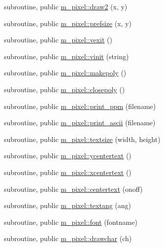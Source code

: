 \begin{DoxyCompactItemize}
\item 
subroutine, public \mbox{\hyperlink{namespacem__pixel_a12012e819bb14b27d2b49732aa2e4e55}{m\+\_\+pixel\+::draw2}} (x, y)
\item 
subroutine, public \mbox{\hyperlink{namespacem__pixel_acc868686f05b7e0b3cd33bf9d1c6bb98}{m\+\_\+pixel\+::prefsize}} (x, y)
\item 
subroutine, public \mbox{\hyperlink{namespacem__pixel_a19ad6b65752322b0029a62cc0ebec3e8}{m\+\_\+pixel\+::vexit}} ()
\item 
subroutine, public \mbox{\hyperlink{namespacem__pixel_ac03ca8f23fdadb60599b6ea4dc87a6d9}{m\+\_\+pixel\+::vinit}} (string)
\item 
subroutine, public \mbox{\hyperlink{namespacem__pixel_ab7128437f95b40004bf73fc6e3f597f8}{m\+\_\+pixel\+::makepoly}} ()
\item 
subroutine, public \mbox{\hyperlink{namespacem__pixel_ab3dc83b63d2ab1bf3f63932abca4245d}{m\+\_\+pixel\+::closepoly}} ()
\item 
subroutine, public \mbox{\hyperlink{namespacem__pixel_a01797b04ce7c693c3fd6a841e8d1de48}{m\+\_\+pixel\+::print\+\_\+ppm}} (filename)
\item 
subroutine, public \mbox{\hyperlink{namespacem__pixel_ab2bb47aea567667b1b92c8265bcb36fb}{m\+\_\+pixel\+::print\+\_\+ascii}} (filename)
\item 
subroutine, public \mbox{\hyperlink{namespacem__pixel_a070e9fff1f2cd0c89d40c5d3c72b7f2c}{m\+\_\+pixel\+::textsize}} (width, height)
\item 
subroutine, public \mbox{\hyperlink{namespacem__pixel_a2e32105b5e77abf38768fec6b11376a3}{m\+\_\+pixel\+::ycentertext}} ()
\item 
subroutine, public \mbox{\hyperlink{namespacem__pixel_a1e0c43d36b35eafea921f91c31d8a478}{m\+\_\+pixel\+::xcentertext}} ()
\item 
subroutine, public \mbox{\hyperlink{namespacem__pixel_a9ddc8e8604bbc3181c728f08a6b87904}{m\+\_\+pixel\+::centertext}} (onoff)
\item 
subroutine, public \mbox{\hyperlink{namespacem__pixel_a5e213461e9894b99c9e8f278d5c4a858}{m\+\_\+pixel\+::textang}} (ang)
\item 
subroutine, public \mbox{\hyperlink{namespacem__pixel_a566adb827a3a26ba42d4e86e4c6e12af}{m\+\_\+pixel\+::font}} (fontname)
\item 
subroutine, public \mbox{\hyperlink{namespacem__pixel_a58406ffd6c2a9fdf2ea7772198b54255}{m\+\_\+pixel\+::drawchar}} (ch)
\item 

\end{DoxyCompactItemize}
